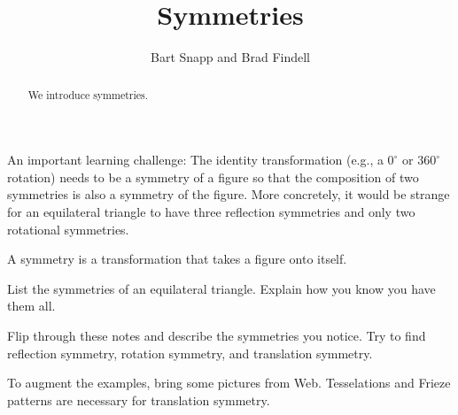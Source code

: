 \documentclass[nooutcomes,instructornotes]{ximera}
\title{Symmetries}
\author{Bart Snapp and Brad Findell}
\begin{document}
\begin{abstract}
  We introduce symmetries.
\end{abstract}
\maketitle

\begin{teachingnote}
An important learning challenge: The identity transformation (e.g., a $0^\circ$ or $360^\circ$ rotation) needs to be a symmetry of a figure so that the composition of two symmetries is also a symmetry of the figure.  More concretely, it would be strange for an equilateral triangle to have three reflection symmetries and only two rotational symmetries.
\end{teachingnote}

\begin{definition}
A symmetry is a transformation that takes a figure onto itself.  
\end{definition}
\begin{problem}
List the symmetries of an equilateral triangle.  Explain how you know you have them all.  
\end{problem}

\begin{problem}
Flip through these notes and describe the symmetries you notice.  Try to find reflection symmetry, rotation symmetry, and translation symmetry.  
\end{problem}

\begin{teachingnote}
To augment the examples, bring some pictures from Web.   Tesselations and Frieze patterns are necessary for translation symmetry.  
\end{teachingnote}
\end{document}
